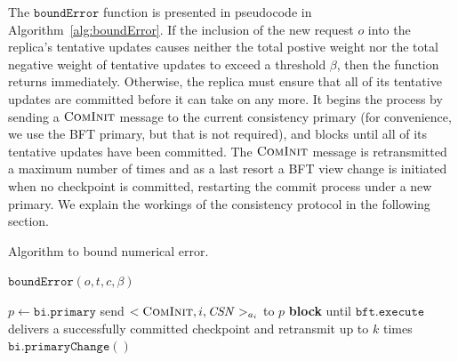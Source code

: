 \documentclass[twocolumn,10pt]{article}
\begin{document}
{The $\mathtt{boundError}$ function is presented in pseudocode in
Algorithm~\ref{alg:boundError}. If the inclusion of the new request $o$
into the replica's tentative updates causes neither the total
postive weight nor the total negative weight of tentative updates to
exceed a threshold $\beta$, then the function returns immediately.
Otherwise, the replica must ensure that all of its tentative updates are
committed before it can take on any more.  It begins the process by
sending a $\textsc{ComInit}$ message to the current consistency
primary (for convenience, we use the BFT primary, but that is not
required), and blocks until all of its tentative updates have been
committed.  The $\textsc{ComInit}$ message is retransmitted a
maximum number of times and as a last resort a BFT view change is
initiated when no checkpoint is committed, restarting the commit process
under a new primary.  We explain the workings of the consistency
protocol in the following section.

\begin{algorithm}
\small
\caption{Algorithm to bound numerical error.}
$\mathtt{boundError}(o, t, c, \beta)$
\begin{algorithmic}[1]\label{alg:boundError}
\STATE $p \leftarrow \mathtt{bi.primary}$ 
\STATE send $<\textsc{ComInit}, i, \mathit{CSN}>_{a_i}$ to $p$
\STATE \textbf{block} until $\mathtt{bft.execute}$ delivers
  a successfully committed checkpoint and retransmit up to $k$ times
\STATE $\mathtt{bi.primaryChange}()$ 
\ENDIF
\ENDIF
\end{algorithmic}
\end{algorithm}


}
\end{document}
